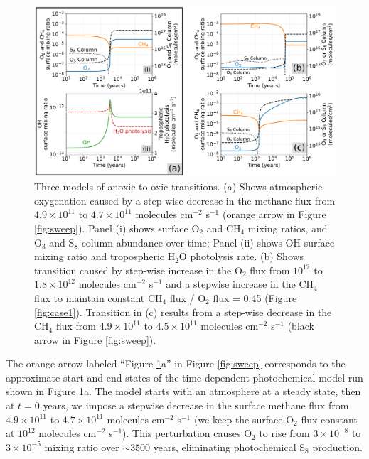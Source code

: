 \begin{figure}
  \centering
  \includegraphics[width=\textwidth]{tex/4goe/main/Oxygenation.pdf}
  \caption{Three models of anoxic to oxic transitions. (a) Shows atmospheric oxygenation caused by a step-wise decrease in the methane flux from $4.9 \times 10^{11}$ to $4.7 \times 10^{11}$ molecules cm$^{-2}$ s$^{-1}$ (orange arrow in Figure \ref{fig:sweep}). Panel (i) shows surface O$_2$ and CH$_4$ mixing ratios, and O$_3$ and S$_8$ column abundance over time; Panel (ii) shows OH surface mixing ratio and tropospheric H$_2$O photolysis rate. (b) Shows transition caused by step-wise increase in the O$_2$ flux from $10^{12}$ to $1.8 \times 10^{12}$ molecules cm$^{-2}$ s$^{-1}$ and a stepwise increase in the CH$_4$ flux to maintain constant CH$_4$ flux / O$_2$ flux = 0.45 (Figure \ref{fig:case1}). Transition in (c) results from a step-wise decrease in the CH$_4$ flux from $4.9 \times 10^{11}$ to $4.5 \times 10^{11}$ molecules cm$^{-2}$ s$^{-1}$ (black arrow in Figure \ref{fig:sweep}).}
  \label{fig:oxygenation}
\end{figure}

The orange arrow labeled ``Figure \ref{fig:oxygenation}a'' in Figure \ref{fig:sweep} corresponds to the approximate start and end states of the time-dependent photochemical model run shown in Figure \ref{fig:oxygenation}a. The model starts with an atmosphere at a steady state, then at $t = 0$ years, we impose a stepwise decrease in the surface methane flux from $4.9 \times 10^{11}$ to $4.7 \times 10^{11}$ molecules cm$^{-2}$ s$^{-1}$ (we keep the surface O$_2$ flux constant at $10^{12}$ molecules cm$^{-2}$ s$^{-1}$). This perturbation causes O$_2$ to rise from $3 \times 10^{-8}$ to $3 \times 10^{-5}$ mixing ratio over $\sim 3500$ years, eliminating photochemical S$_8$ production. 

